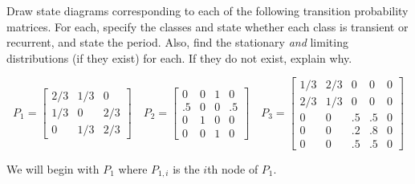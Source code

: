 \documentclass[10pt,a4paper]{exam}
\begin{document}
\begin{questions}


\question Draw state diagrams corresponding to each of the following transition probability matrices. For each, specify the classes and state whether each class is transient or recurrent, and state the period. Also, find the stationary \textit{and} limiting distributions (if they exist) for each. If they do not exist, explain why.

$$P_1 = \begin{bmatrix}
2/3 & 1/3 & 0\\1/3 & 0 & 2/3\\0 & 1/3 & 2/3
\end{bmatrix} \quad P_2 = \begin{bmatrix}
0 & 0 & 1 & 0\\.5 & 0 & 0 & .5\\ 0 & 1 & 0 & 0\\0 & 0 & 1 & 0
\end{bmatrix} \quad P_3 = \begin{bmatrix}
1/3 & 2/3 & 0 & 0 & 0\\2/3 & 1/3 & 0 & 0 & 0\\0 & 0 & .5 & .5 & 0\\0 & 0 & .2 & .8 & 0\\0 & 0 & .5 & .5 & 0
\end{bmatrix}$$

\begin{solution}
We will begin with $P_1$ where $P_{1,i}$ is the $i$th node of $P_1$.


\end{solution}
\end{questions}
\end{document}

